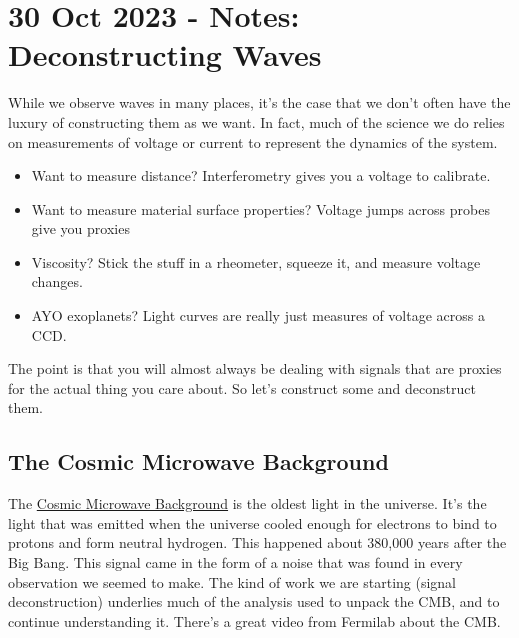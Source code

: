 \section{30 Oct 2023 - Notes: Deconstructing
Waves}\label{oct-2023---notes-deconstructing-waves}

While we observe waves in many places, it's the case that we don't often
have the luxury of constructing them as we want. In fact, much of the
science we do relies on measurements of voltage or current to represent
the dynamics of the system.

\begin{itemize}
\tightlist
\item
  Want to measure distance? Interferometry gives you a voltage to
  calibrate.
\item
  Want to measure material surface properties? Voltage jumps across
  probes give you proxies
\item
  Viscosity? Stick the stuff in a rheometer, squeeze it, and measure
  voltage changes.
\item
  AYO exoplanets? Light curves are really just measures of voltage
  across a CCD.
\end{itemize}

The point is that you will almost always be dealing with signals that
are proxies for the actual thing you care about. So let's construct some
and deconstruct them.

\subsection{The Cosmic Microwave
Background}\label{the-cosmic-microwave-background}

The
\href{https://en.wikipedia.org/wiki/Cosmic_microwave_background}{Cosmic
Microwave Background} is the oldest light in the universe. It's the
light that was emitted when the universe cooled enough for electrons to
bind to protons and form neutral hydrogen. This happened about 380,000
years after the Big Bang. This signal came in the form of a noise that
was found in every observation we seemed to make. The kind of work we
are starting (signal deconstruction) underlies much of the analysis used
to unpack the CMB, and to continue understanding it. There's a great
video from Fermilab about the CMB.

\href{https://inv.tux.pizza/watch?v=AYFDN2DSVgc}{\pandocbounded{\texttt{[image: https://markdown-videos-api.jorgenkh.no/youtube/AYFDN2DSVgc?width=720\&height=405]}}}

